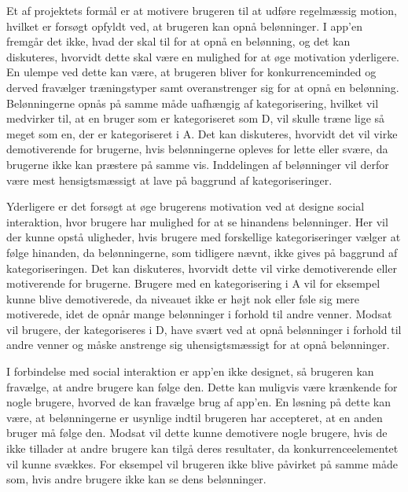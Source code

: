 Et af projektets formål er at motivere brugeren til at udføre regelmæssig motion, hvilket er forsøgt opfyldt ved, at brugeren kan opnå belønninger. I app’en fremgår det ikke, hvad der skal til for at opnå en belønning, og det kan diskuteres, hvorvidt dette skal være en mulighed for at øge motivation yderligere. En ulempe ved dette kan være, at brugeren bliver for konkurrenceminded og derved fravælger træningstyper samt overanstrenger sig for at opnå en belønning. Belønningerne opnås på samme måde uafhængig af kategorisering, hvilket vil medvirker til, at en bruger som er kategoriseret som D, vil skulle træne lige så meget som en, der er kategoriseret i A. Det kan diskuteres, hvorvidt det vil virke demotiverende for brugerne, hvis belønningerne opleves for lette eller svære, da brugerne ikke kan præstere på samme vis.  Inddelingen af belønninger vil derfor være mest hensigtsmæssigt at lave på baggrund af kategoriseringer. 

Yderligere er det forsøgt at øge brugerens  motivation ved at designe social interaktion, hvor brugere har mulighed for at se hinandens belønninger. Her vil der kunne opstå uligheder, hvis brugere med forskellige kategoriseringer vælger at følge hinanden, da belønningerne, som tidligere nævnt, ikke gives på baggrund af kategoriseringen. Det kan diskuteres, hvorvidt dette vil virke demotiverende eller motiverende for brugerne. Brugere med en kategorisering i A vil for eksempel kunne blive demotiverede, da niveauet ikke er højt nok eller føle sig mere motiverede, idet de opnår mange belønninger i forhold til andre venner. Modsat vil brugere, der kategoriseres i D, have svært ved at opnå belønninger i forhold til andre venner og måske anstrenge sig uhensigtsmæssigt for at opnå belønninger. 

I forbindelse med social interaktion er app’en ikke designet, så brugeren kan fravælge, at andre brugere kan følge den. Dette kan muligvis være krænkende  for nogle brugere, hvorved de kan fravælge brug af app’en. En løsning på dette kan være, at belønningerne er usynlige indtil brugeren har accepteret, at en anden bruger må følge den. Modsat vil dette kunne demotivere nogle brugere, hvis de ikke tillader at andre brugere kan tilgå deres resultater, da konkurrenceelementet vil kunne svækkes. For eksempel vil brugeren ikke blive påvirket på samme måde som, hvis andre brugere ikke kan se dens belønninger.

